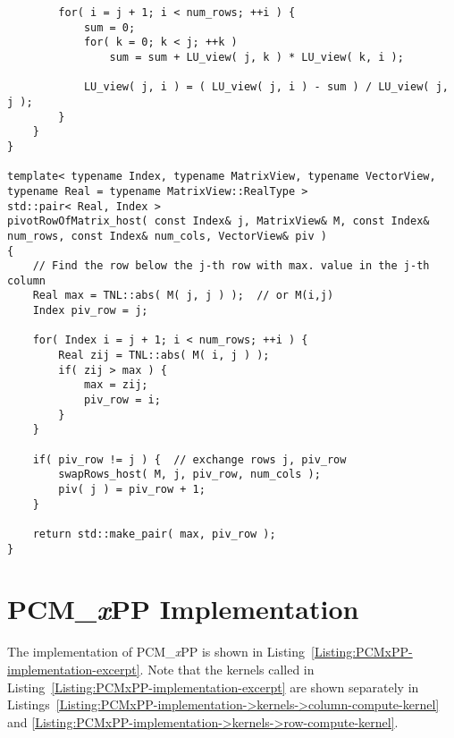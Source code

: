 \begin{lstlisting}
		for( i = j + 1; i < num_rows; ++i ) {
			sum = 0;
			for( k = 0; k < j; ++k )
				sum = sum + LU_view( j, k ) * LU_view( k, i );
			
			LU_view( j, i ) = ( LU_view( j, i ) - sum ) / LU_view( j, j );
		}
	}
}

template< typename Index, typename MatrixView, typename VectorView, typename Real = typename MatrixView::RealType >
std::pair< Real, Index >
pivotRowOfMatrix_host( const Index& j, MatrixView& M, const Index& num_rows, const Index& num_cols, VectorView& piv )
{
	// Find the row below the j-th row with max. value in the j-th column
	Real max = TNL::abs( M( j, j ) );  // or M(i,j)
	Index piv_row = j;
	
	for( Index i = j + 1; i < num_rows; ++i ) {
		Real zij = TNL::abs( M( i, j ) );
		if( zij > max ) {
			max = zij;
			piv_row = i;
		}
	}
	
	if( piv_row != j ) {  // exchange rows j, piv_row
		swapRows_host( M, j, piv_row, num_cols );
		piv( j ) = piv_row + 1;
	}
	
	return std::make_pair( max, piv_row );
}
\end{lstlisting}





\chapter{PCM\_\textit{x}PP Implementation}\label{Appendix:PCMxPP-implementation}
The implementation of PCM\_\textit{x}PP is shown in Listing~\ref{Listing:PCMxPP-implementation-excerpt}.
Note that the kernels called in Listing~\ref{Listing:PCMxPP-implementation-excerpt} are shown separately in Listings~\ref{Listing:PCMxPP-implementation->kernels->column-compute-kernel} and \ref{Listing:PCMxPP-implementation->kernels->row-compute-kernel}.

